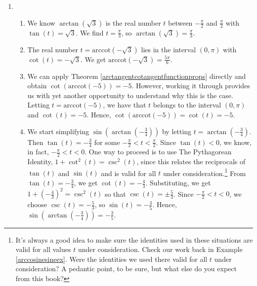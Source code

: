 \documentclass[12pt]{ximera}
\begin{document}
\begin{example}
\begin{enumerate}

\item

\begin{enumerate}

\item  We know $\arctan(\sqrt{3})$ is the real number $t$ between $-\frac{\pi}{2}$ and $\frac{\pi}{2}$ with $\tan(t) = \sqrt{3}$.  We find $t = \frac{\pi}{3}$, so $\arctan(\sqrt{3}) = \frac{\pi}{3}$.

\item The real number $t = \mbox{arccot}(-\sqrt{3})$ lies in the interval $(0,\pi)$ with $\cot(t) = -\sqrt{3}$.  We get $\mbox{arccot}(-\sqrt{3}) = \frac{5\pi}{6}$.

\item  We can apply Theorem \ref{arctangentcotangentfunctionprops} directly and obtain $\cot(\mbox{arccot}(-5)) = -5$.  However, working it through provides us with yet another opportunity to understand why this is the case. Letting $t = \mbox{arccot}(-5)$, we have that $t$ belongs to the interval $(0,\pi)$ and $\cot(t)=-5$.  Hence, $\cot(\mbox{arccot}(-5)) = \cot(t)=-5$.

\item   We start simplifying  $\sin\left(\arctan\left(-\frac{3}{4}\right)\right)$ by letting $t = \arctan\left(-\frac{3}{4}\right)$.  Then $\tan(t) = -\frac{3}{4}$ for some $-\frac{\pi}{2} < t < \frac{\pi}{2}$.  Since $\tan(t) < 0$, we know, in fact, $-\frac{\pi}{2} < t < 0$.  One way to proceed is to use The Pythagorean Identity, $1 + \cot^{2}(t) = \csc^{2}(t)$, since this relates the reciprocals of $\tan(t)$ and $\sin(t)$ and is valid for all $t$ under consideration.\footnote{It's always a good idea to make sure the identities used in these situations are valid for all values $t$ under consideration.  Check our work back in Example \ref{arccosinesineex}.  Were the identities we used there valid for all $t$ under consideration?  A pedantic point, to be sure, but what else do you expect from this book?}   From  $\tan(t) = -\frac{3}{4}$, we get $\cot(t) = -\frac{4}{3}$.  Substituting, we get $1 + \left(-\frac{4}{3}\right)^2 = \csc^{2}(t)$ so that $\csc(t) = \pm \frac{5}{3}$.  Since $-\frac{\pi}{2} < t < 0$, we choose $\csc(t) = -\frac{5}{3}$, so $\sin(t) = -\frac{3}{5}$. Hence, $\sin\left(\arctan\left(-\frac{3}{4}\right)\right) = -\frac{3}{5}$.

\end{enumerate}


\end{enumerate}
\end{example}
\end{document}
